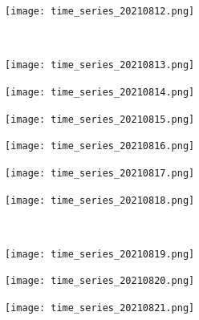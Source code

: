 \documentclass[10pt]{article}
\begin{document}
\begin{figure}[!h]
\begin{subfigure}[b]{0.166\linewidth}
    \end{subfigure}%
        \begin{subfigure}[b]{0.166\linewidth}
        \centering
        \texttt{[image: time\_series\_20210812.png]}
    \end{subfigure}
    \\
    \begin{subfigure}[b]{0.166\linewidth}
        \centering
        \texttt{[image: time\_series\_20210813.png]}
    \end{subfigure}%
    \begin{subfigure}[b]{0.166\linewidth}
        \centering
        \texttt{[image: time\_series\_20210814.png]}
    \end{subfigure}%
    \begin{subfigure}[b]{0.166\linewidth}
        \centering
        \texttt{[image: time\_series\_20210815.png]}
    \end{subfigure}%
    \begin{subfigure}[b]{0.166\linewidth}
        \centering
        \texttt{[image: time\_series\_20210816.png]}
    \end{subfigure}%
        \begin{subfigure}[b]{0.166\linewidth}
        \centering
        \texttt{[image: time\_series\_20210817.png]}
    \end{subfigure}%
    \begin{subfigure}[b]{0.166\linewidth}
        \centering
        \texttt{[image: time\_series\_20210818.png]}
    \end{subfigure}
    \\
    \begin{subfigure}[b]{0.166\linewidth}
        \centering
        \texttt{[image: time\_series\_20210819.png]}
    \end{subfigure}%
    \begin{subfigure}[b]{0.166\linewidth}
        \centering
        \texttt{[image: time\_series\_20210820.png]}
    \end{subfigure}%
    \begin{subfigure}[b]{0.166\linewidth}
        \centering
        \texttt{[image: time\_series\_20210821.png]}
    \end{subfigure}%
        \begin{subfigure}[b]{0.166\linewidth}

\end{subfigure}
\end{figure}
\end{document}
